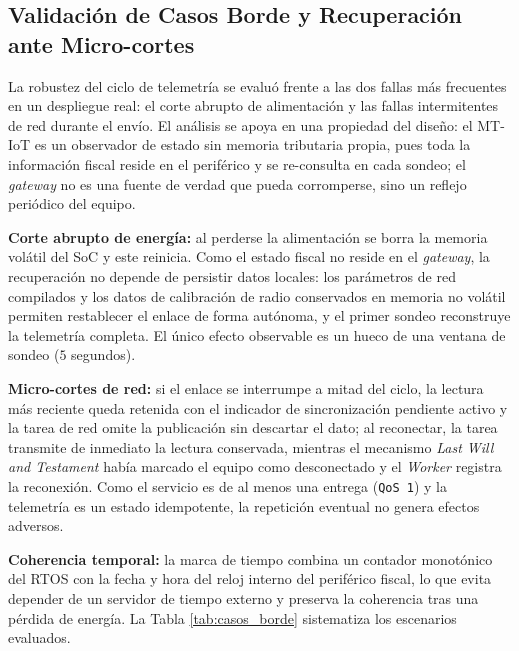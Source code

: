 \subsection{Validación de Casos Borde y Recuperación ante Micro-cortes}

\par La robustez del ciclo de telemetría se evaluó frente a las dos fallas más frecuentes en un despliegue real: el corte abrupto de alimentación y las fallas intermitentes de red durante el envío. El análisis se apoya en una propiedad del diseño: el MT-IoT es un observador de estado sin memoria tributaria propia, pues toda la información fiscal reside en el periférico y se re-consulta en cada sondeo; el \textit{gateway} no es una fuente de verdad que pueda corromperse, sino un reflejo periódico del equipo.\\

\par \textbf{Corte abrupto de energía:} al perderse la alimentación se borra la memoria volátil del SoC y este reinicia. Como el estado fiscal no reside en el \textit{gateway}, la recuperación no depende de persistir datos locales: los parámetros de red compilados y los datos de calibración de radio conservados en memoria no volátil permiten restablecer el enlace de forma autónoma, y el primer sondeo reconstruye la telemetría completa. El único efecto observable es un hueco de una ventana de sondeo ($5$ segundos).\\

\par \textbf{Micro-cortes de red:} si el enlace se interrumpe a mitad del ciclo, la lectura más reciente queda retenida con el indicador de sincronización pendiente activo y la tarea de red omite la publicación sin descartar el dato; al reconectar, la tarea transmite de inmediato la lectura conservada, mientras el mecanismo \textit{Last Will and Testament} había marcado el equipo como desconectado y el \textit{Worker} registra la reconexión. Como el servicio es de al menos una entrega (\texttt{QoS 1}) y la telemetría es un estado idempotente, la repetición eventual no genera efectos adversos.\\

\par \textbf{Coherencia temporal:} la marca de tiempo combina un contador monotónico del RTOS con la fecha y hora del reloj interno del periférico fiscal, lo que evita depender de un servidor de tiempo externo y preserva la coherencia tras una pérdida de energía. La Tabla \ref{tab:casos_borde} sistematiza los escenarios evaluados.\\

